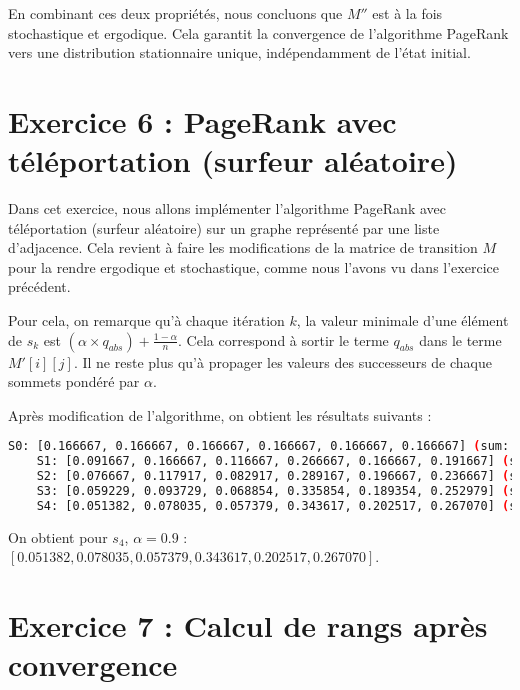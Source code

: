 En combinant ces deux propriétés, nous concluons que $M''$ est à la fois stochastique et ergodique. Cela garantit la convergence de l'algorithme PageRank vers une distribution stationnaire unique, indépendamment de l'état initial.

\section{Exercice 6 : PageRank avec téléportation (surfeur aléatoire)}

Dans cet exercice, nous allons implémenter l'algorithme PageRank avec téléportation (surfeur aléatoire) sur un graphe représenté par une liste d'adjacence. Cela revient à faire les modifications de la matrice de transition $M$ pour la rendre ergodique et stochastique, comme nous l'avons vu dans l'exercice précédent.

Pour cela, on remarque qu'à chaque itération $k$, la valeur minimale d'une élément de $s_k$ est $(\alpha \times q_{abs}) + \frac{1-\alpha}{n}$. Cela correspond à sortir le terme $q_{abs}$ dans le terme $M'[i][j]$. Il ne reste plus qu'à propager les valeurs des successeurs de chaque sommets pondéré par $\alpha$.

Après modification de l'algorithme, on obtient les résultats suivants :

\begin{minipage}{\dimexpr\linewidth-20pt}
    \begin{lstlisting}[language=bash, caption={Résultat de l'algorithme PageRank sur le graphe $G_2$ fourni, pour $k = 4$, avec la somme des valeurs du vecteur $s_k$ à chaque itération $k$, pour PageRank modifié avec téléportation et $\alpha = 0.9$.}]
    S0: [0.166667, 0.166667, 0.166667, 0.166667, 0.166667, 0.166667] (sum: 1.000000)
    S1: [0.091667, 0.166667, 0.116667, 0.266667, 0.166667, 0.191667] (sum: 1.000000)
    S2: [0.076667, 0.117917, 0.082917, 0.289167, 0.196667, 0.236667] (sum: 1.000000)
    S3: [0.059229, 0.093729, 0.068854, 0.335854, 0.189354, 0.252979] (sum: 1.000000)
    S4: [0.051382, 0.078035, 0.057379, 0.343617, 0.202517, 0.267070] (sum: 1.000000)
    \end{lstlisting}
\end{minipage}

On obtient pour $s_4$, $\alpha = 0.9$ : $[0.051382, 0.078035, 0.057379, 0.343617, 0.202517, 0.267070]$.

\section{Exercice 7 : Calcul de rangs après convergence}


